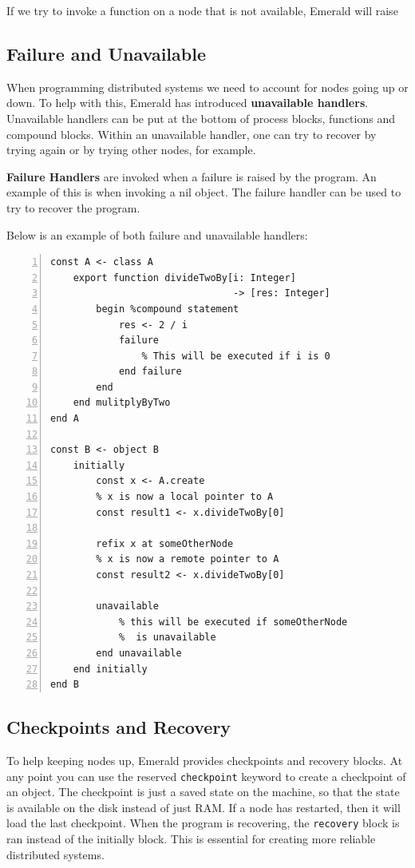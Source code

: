 If we try to invoke a function on a node that is not available, Emerald will raise 




\subsection{Failure and Unavailable}
When programming distributed systems we need to account for nodes going up or down. To help with this, Emerald has introduced \textbf{unavailable handlers}. Unavailable handlers can be put at the bottom of process blocks, functions and compound blocks. Within an unavailable handler, one can try to recover by trying again or by trying other nodes, for example.

\textbf{Failure Handlers} are invoked when a failure is raised by the program. An example of this is when invoking a nil object. The failure handler can be used to try to recover the program.

Below is an example of both failure and unavailable handlers:
\begin{lstlisting}[language=emerald, numbers=left]
const A <- class A
    export function divideTwoBy[i: Integer] 
                                -> [res: Integer]
        begin %compound statement
            res <- 2 / i
            failure
                % This will be executed if i is 0
            end failure
        end
    end mulitplyByTwo
end A

const B <- object B
    initially
        const x <- A.create
        % x is now a local pointer to A
        const result1 <- x.divideTwoBy[0]
        
        refix x at someOtherNode
        % x is now a remote pointer to A
        const result2 <- x.divideTwoBy[0]
        
        unavailable
            % this will be executed if someOtherNode
            %  is unavailable
        end unavailable
    end initially
end B
\end{lstlisting}






\subsection{Checkpoints and Recovery}
To help keeping nodes up, Emerald provides checkpoints and recovery blocks. At any point you can use the reserved \verb|checkpoint| keyword to create a checkpoint of an object. The checkpoint is just a saved state on the machine, so that the state is available on the disk instead of just RAM. If a node has restarted, then it will load the last checkpoint. When the program is recovering, the \verb|recovery| block is ran instead of the initially block. This is essential for creating more reliable distributed systems.



